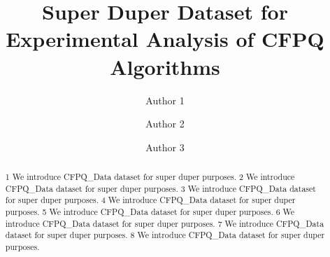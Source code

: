 \documentclass[sigconf]{acmart}
\begin{document}
\title{Super Duper Dataset for Experimental Analysis of CFPQ Algorithms}

\author{Author 1}
\author{Author 2}
\authornotemark[1]

\author{Author 3}


\begin{abstract}
  1 We introduce CFPQ\_Data dataset for super duper purposes.
  2 We introduce CFPQ\_Data dataset for super duper purposes.
  3 We introduce CFPQ\_Data dataset for super duper purposes.
  4 We introduce CFPQ\_Data dataset for super duper purposes.
  5 We introduce CFPQ\_Data dataset for super duper purposes.
  6 We introduce CFPQ\_Data dataset for super duper purposes.
  7 We introduce CFPQ\_Data dataset for super duper purposes.
  8 We introduce CFPQ\_Data dataset for super duper purposes.
\end{abstract}
\end{document}
